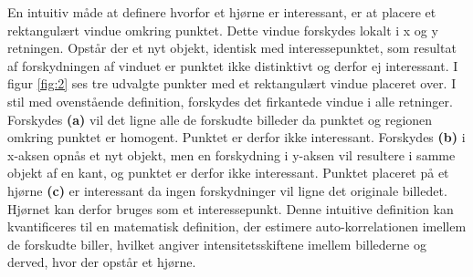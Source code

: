 En intuitiv måde at definere hvorfor et hjørne er interessant, er at placere et rektangulært vindue omkring punktet. Dette vindue forskydes lokalt i x og y retningen. Opstår der et nyt objekt, identisk med interessepunktet, som resultat af forskydningen af vinduet er punktet ikke  distinktivt og derfor ej interessant. I figur \ref{fig:2} ses tre udvalgte punkter med et rektangulært vindue placeret over. I stil med ovenstående definition, forskydes det firkantede vindue i alle retninger. Forskydes \textbf{(a)} vil det ligne alle de forskudte billeder da punktet og regionen omkring punktet er homogent. Punktet er derfor ikke interessant. Forskydes \textbf{(b)} i x-aksen opnås et nyt objekt, men en forskydning i y-aksen vil resultere i samme objekt af en kant, og punktet er derfor ikke interessant. Punktet placeret på et hjørne \textbf{(c)} er interessant da ingen forskydninger vil ligne det originale billedet. Hjørnet kan derfor bruges som et interessepunkt. Denne intuitive definition kan kvantificeres til en matematisk definition, der estimere auto-korrelationen imellem de forskudte biller, hvilket angiver intensitetsskiftene imellem billederne og derved, hvor der opstår et hjørne. 
